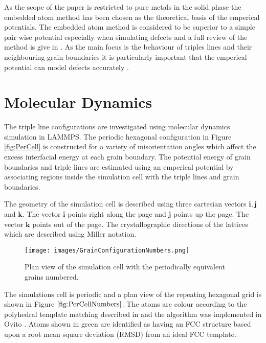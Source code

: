 \documentclass[12pt,a4paper]{book}
\begin{document}
As the scope of the paper is restricted to pure metals in the solid phase the embedded atom method has been chosen as the theoretical basis of the emperical potentials. The embedded atom method is considered to be superior to a simple pair wise potential especially when simulating defects and a full review of the method is give in \cite{Daw1993}. As the main focus is the behaviour of triples lines and their neighbouring grain boundaries it is particularly important that the emperical potential can model defects accurately . 



\chapter{Molecular Dynamics}

The triple line configurations are investigated using molecular dynamics simulation in LAMMPS. The periodic hexagonal configuration in Figure \ref{fig:PerCell} is constructed for a variety of misorientation angles which affect the excess interfacial energy at each grain boundary. The potential energy of grain boundaries and triple lines are estimated using an emperical potential by associating regions inside the simulation cell with the triple lines and grain boundaries. 

The geometry of the simulation cell is described using three cartesian vectors $\mathbf{i}, \mathbf{j}$ and $\mathbf{k}$. The vector $\mathbf{i}$ points right along the page and $\mathbf{j}$  points up the page. The vector $\mathbf{k}$ points out of the page. The crystallographic directions of the lattices which are described using Miller notation.

\begin{figure}
	\texttt{[image: images/GrainConfigurationNumbers.png]}
	\caption{Plan view of the simulation cell with the periodically equivalent grains numbered.}
	\label{fig:PerCellNumbers} 
\end{figure}

The simulations cell is periodic and a plan view of the repeating hexagonal grid is shown in Figure $\ref{fig:PerCellNumbers}$. The atoms are colour according to the polyhedral template matching described in \cite{Larsen_2016} and the algorithm  was implemented in Ovito \cite{Stukowski2009}. Atoms shown in green are identified as having an FCC structure based upon a root mean square deviation (RMSD) from an ideal FCC template. 
\end{document}
